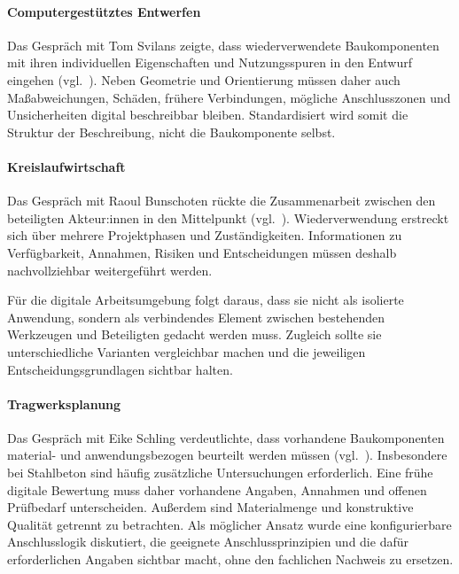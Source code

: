 \documentclass[type=zwischenbericht]{zukunftbau}
\begin{document}
\begin{SemioNest}
\begin{SemioNest}
\paragraph{Computergestütztes Entwerfen}
Das Gespräch mit Tom Svilans zeigte, dass wiederverwendete Baukomponenten mit ihren individuellen Eigenschaften und Nutzungsspuren in den Entwurf eingehen (vgl.\ ). Neben Geometrie und Orientierung müssen daher auch Maßabweichungen, Schäden, frühere Verbindungen, mögliche Anschlusszonen und Unsicherheiten digital beschreibbar bleiben. Standardisiert wird somit die Struktur der Beschreibung, nicht die Baukomponente selbst.

\paragraph{Kreislaufwirtschaft}
Das Gespräch mit Raoul Bunschoten rückte die Zusammenarbeit zwischen den beteiligten Akteur:innen in den Mittelpunkt (vgl.\ ). Wiederverwendung erstreckt sich über mehrere Projektphasen und Zuständigkeiten. Informationen zu Verfügbarkeit, Annahmen, Risiken und Entscheidungen müssen deshalb nachvollziehbar weitergeführt werden.

Für die digitale Arbeitsumgebung folgt daraus, dass sie nicht als isolierte Anwendung, sondern als verbindendes Element zwischen bestehenden Werkzeugen und Beteiligten gedacht werden muss. Zugleich sollte sie unterschiedliche Varianten vergleichbar machen und die jeweiligen Entscheidungsgrundlagen sichtbar halten.

\paragraph{Tragwerksplanung}
Das Gespräch mit Eike Schling verdeutlichte, dass vorhandene Baukomponenten material- und anwendungsbezogen beurteilt werden müssen (vgl.\ ). Insbesondere bei Stahlbeton sind häufig zusätzliche Untersuchungen erforderlich. Eine frühe digitale Bewertung muss daher vorhandene Angaben, Annahmen und offenen Prüfbedarf unterscheiden. Außerdem sind Materialmenge und konstruktive Qualität getrennt zu betrachten. Als möglicher Ansatz wurde eine konfigurierbare Anschlusslogik diskutiert, die geeignete Anschlussprinzipien und die dafür erforderlichen Angaben sichtbar macht, ohne den fachlichen Nachweis zu ersetzen.
\end{SemioNest}
\end{SemioNest}
\end{document}
